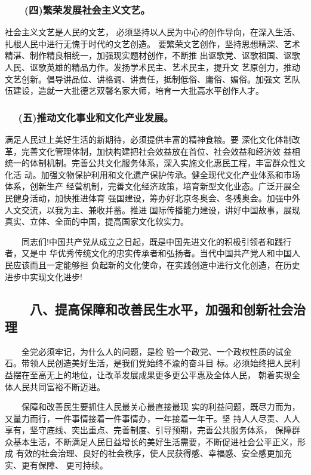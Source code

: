 \documentclass[11pt]{ctexart}
\begin{document}
{{{{\subsubsection{　　(四)繁荣发展社会主义文艺。}
\label{sec:org8334af4}

社会主义文艺是人民的文艺，
必须坚持以人民为中心的创作导向，在深入生活、扎根人民中进行无愧于时代的文艺创造。
要繁荣文艺创作，坚持思想精深、艺术精湛、制作精良相统一，加强现实题材创作，不断推
出讴歌党、讴歌祖国、讴歌人民、讴歌英雄的精品力作。发扬学术民主、艺术民主，提升文
艺原创力，推动文艺创新。倡导讲品位、讲格调、讲责任，抵制低俗、庸俗、媚俗。加强文
艺队伍建设，造就一大批德艺双馨名家大师，培育一大批高水平创作人才。

\subsubsection{　 (五)推动文化事业和文化产业发展。}
\label{sec:org7bc57ec}

满足人民过上美好生活的新期待，必须提供丰富的精神食粮。要
深化文化体制改革，完善文化管理体制，加快构建把社会效益放在首位、社会效益和经济效
益相统一的体制机制。完善公共文化服务体系，深入实施文化惠民工程，丰富群众性文化活
动。加强文物保护利用和文化遗产保护传承。健全现代文化产业体系和市场体系，创新生产
经营机制，完善文化经济政策，培育新型文化业态。广泛开展全民健身活动，加快推进体育
强国建设，筹办好北京冬奥会、冬残奥会。加强中外人文交流，以我为主、兼收并蓄。推进
国际传播能力建设，讲好中国故事，展现真实、立体、全面的中国，提高国家文化软实力。

　　同志们!中国共产党从成立之日起，既是中国先进文化的积极引领者和践行者，又是中
华优秀传统文化的忠实传承者和弘扬者。当代中国共产党人和中国人民应该而且一定能够担
负起新的文化使命，在实践创造中进行文化创造，在历史进步中实现文化进步!

\subsection{　　八、提高保障和改善民生水平，加强和创新社会治理}
\label{sec:org4388c75}

　　全党必须牢记，为什么人的问题，是检
验一个政党、一个政权性质的试金石。带领人民创造美好生活，是我们党始终不渝的奋斗目
标。必须始终把人民利益摆在至高无上的地位，让改革发展成果更多更公平惠及全体人民，
朝着实现全体人民共同富裕不断迈进。

　　保障和改善民生要抓住人民最关心最直接最现
实的利益问题，既尽力而为，又量力而行，一件事情接着一件事情办，一年接着一年干。坚
持人人尽责、人人享有，坚守底线、突出重点、完善制度、引导预期，完善公共服务体系，
保障群众基本生活，不断满足人民日益增长的美好生活需要，不断促进社会公平正义，形成
有效的社会治理、良好的社会秩序，使人民获得感、幸福感、安全感更加充实、更有保障、
更可持续。

}}}}
\end{document}
